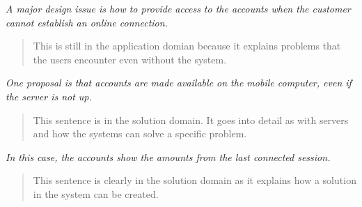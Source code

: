 \documentclass[12pt]{article}
\begin{document}
\emph{A major design issue is how to provide access to the accounts when the customer cannot establish an online connection.}
\begin{quote}
This is still in the application domian because it explains problems that the users encounter even without the system.\\
\end{quote}

\emph{One proposal is that accounts are made available on the mobile computer, even if the server is not up.} 
\begin{quote}
This sentence is in the solution domain. It goes into detail as with servers and how the systems can solve a specific problem.\\
\end{quote}

\emph{In this case, the accounts show the amounts from the last connected session.}
\begin{quote}
This sentence is clearly in the solution domain as it explains how a solution in the system can be created.
\end{quote}
\end{document}
